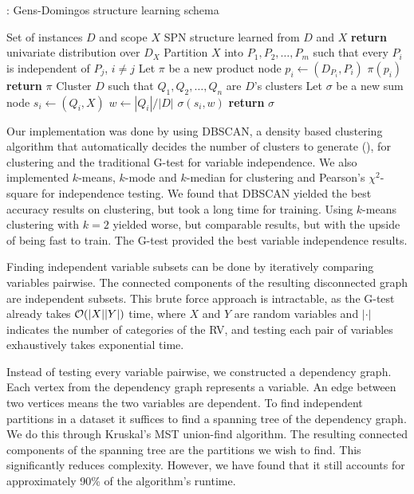 \begin{algorithm}[H]
  \caption{: Gens-Domingos structure learning schema}
  \begin{algorithmic}[1]
    \Require Set of instances $D$ and scope $X$
    \Ensure SPN structure learned from $D$ and $X$
      \State \textbf{return} univariate distribution over $D_X$
    \Else%
      \State Partition $X$ into $P_1,P_2,\ldots,P_m$ such that every $P_i$ is independent of $P_j$,
        $i\neq j$
        \State Let $\pi$ be a new product node
          \State $p_i\gets$$(D_{P_i}, P_i)$
          \State $\pi$$(p_i)$
        \EndFor%
        \State \textbf{return} $\pi$
      \Else%
        \State Cluster $D$ such that $Q_1,Q_2,\ldots,Q_n$ are $D$'s clusters
        \State Let $\sigma$ be a new sum node
          \State $s_i\gets$$(Q_i, X)$
          \State $w\gets |Q_i|/|D|$
          \State $\sigma$$(s_i, w)$ 
        \EndFor%
        \State \textbf{return} $\sigma$
      \EndIf%
    \EndIf%
  \end{algorithmic}
\end{algorithm}

Our implementation was done by using DBSCAN, a density based clustering algorithm that
automatically decides the number of clusters to generate (\cite{dbscan}), for clustering and the
traditional G-test for variable independence. We also implemented $k$-means, $k$-mode and
$k$-median for clustering and Pearson's $\chi^2$-square for independence testing. We found that
DBSCAN yielded the best accuracy results on clustering, but took a long time for training. Using
$k$-means clustering with $k=2$ yielded worse, but comparable results, but with the upside of being
fast to train. The G-test provided the best variable independence results.

Finding independent variable subsets can be done by iteratively comparing variables pairwise. The
connected components of the resulting disconnected graph are independent subsets. This brute force
approach is intractable, as the G-test already takes $\mathcal{O}(|X||Y|)$ time, where $X$ and $Y$ are
random variables and $|\cdot|$ indicates the number of categories of the RV, and testing each pair
of variables exhaustively takes exponential time.

Instead of testing every variable pairwise, we constructed a dependency graph. Each vertex from the
dependency graph represents a variable. An edge between two vertices means the two variables are
dependent. To find independent partitions in a dataset it suffices to find a spanning tree of the
dependency graph. We do this through Kruskal's MST union-find algorithm. The resulting connected
components of the spanning tree are the partitions we wish to find. This significantly reduces
complexity. However, we have found that it still accounts for approximately 90\% of the algorithm's
runtime.

